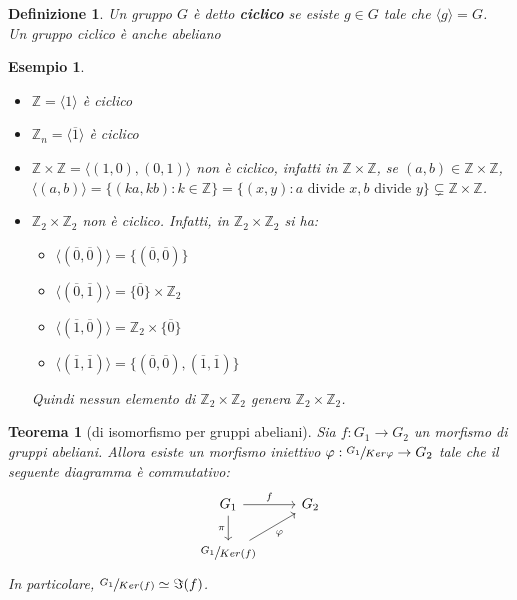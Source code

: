 \documentclass[a4paper,12pt]{article}
\theoremstyle{def}
\newtheorem*{definition}{Definizione}
\theoremstyle{prop}
\theoremstyle{esempio}
\newtheorem*{example}{Esempio}
\theoremstyle{dimostrazione}
\theoremstyle{teo}
\newtheorem*{teorema}{Teorema}
\theoremstyle{osservazione}
\begin{document}
\begin{definition}
	Un gruppo \(G\) è detto \textbf{ciclico} se esiste \(g \in G\) tale che \(\langle g \rangle = G\).\\
	Un gruppo ciclico è anche abeliano
\end{definition}

\begin{example}
	\
	\begin{itemize}
		\item \(\mathbb{Z} = \langle 1 \rangle\) è ciclico
		\item \(\mathbb{Z}_n = \langle \overline{1} \rangle\) è ciclico
		\item \(\mathbb{Z} \times \mathbb{Z} = \langle (1,0), (0,1) \rangle\) non è ciclico,
		      infatti in \(\mathbb{Z}  \times \mathbb{Z} \), se \((a,b) \in \mathbb{Z} \times \mathbb{Z} \),
		      \(\langle (a,b) \rangle = \{(ka,kb) : k \in \mathbb{Z} \} = \{(x,y) : a \text{ divide } x,b \text{ divide } y\}
		      \subsetneq \mathbb{Z} \times \mathbb{Z} \).
		\item \(\mathbb{Z}_2 \times \mathbb{Z}_2\) non è ciclico. Infatti, in \(\mathbb{Z}_2 \times \mathbb{Z}_2\) si ha:
		      \
		      \begin{itemize}
			      \item \(\langle (\overline{0},\overline{0}) \rangle = \{(\overline{0},\overline{0})\}\)
			      \item \(\langle (\overline{0}, \overline{1}) \rangle = \{\overline{0}\} \times \mathbb{Z}_2\)
			      \item  \(\langle (\overline{1}, \overline{0}) \rangle = \mathbb{Z}_2 \times \{\overline{0}\}\)
			      \item \(\langle (\overline{1}, \overline{1}) \rangle = \{(\overline{0},\overline{0}),(\overline{1},\overline{1})\}\)
		      \end{itemize}
		      Quindi nessun elemento di \(\mathbb{Z}_2 \times \mathbb{Z}_2\) genera \(\mathbb{Z}_2 \times \mathbb{Z}_2\).
	\end{itemize}
\end{example}

\begin{teorema}[di isomorfismo per gruppi abeliani]
	Sia \(f: G_1 \rightarrow G_2\) un morfismo di gruppi abeliani. Allora esiste un morfismo iniettivo
	\(\varphi : \sfrac{G_1}{Ker \varphi} \rightarrow G_2\) tale che il seguente diagramma è commutativo:
	\[
		\begin{tikzcd}
			G_1 \arrow[r, "f"] \arrow[d, "\pi"'] & G_2 \\
			\sfrac{G_1}{Ker(f)} \arrow[ru, "\varphi"']
		\end{tikzcd}
	\]
	In particolare, \(\sfrac{G_1}{Ker(f)} \simeq \Im(f)\).
\end{teorema}
\end{document}

